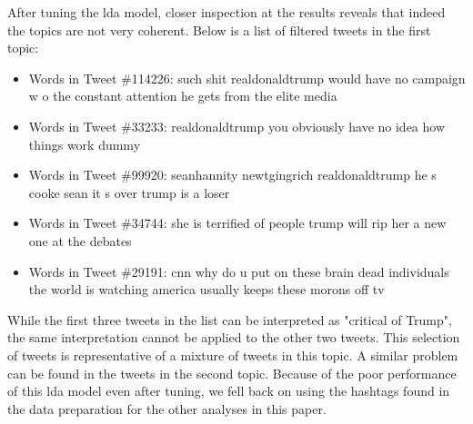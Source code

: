 \documentclass{article}
\begin{document}
  After tuning the lda model, closer inspection at the results reveals
  that indeed the topics are not very coherent. Below is a list of
  filtered tweets in the first topic:

  \begin{itemize}
    \item Words in Tweet \#114226: such shit realdonaldtrump would have
      no campaign w o the constant attention he gets from the elite
      media
    \item Words in Tweet \#33233:  realdonaldtrump you obviously have
      no idea how things work dummy
    \item Words in Tweet \#99920:  seanhannity newtgingrich
      realdonaldtrump he s cooke sean it s over trump is a loser
    \item Words in Tweet \#34744: she is terrified of people trump will
      rip her a new one at the debates
    \item Words in Tweet \#29191:  cnn why do u put on these brain dead individuals the world is watching america usually keeps these morons off tv 
  \end{itemize}

  While the first three tweets in the list can be interpreted as
  "critical of Trump", the same interpretation cannot be applied to
  the other two tweets. This selection of tweets is representative of
  a mixture of tweets in this topic. A similar problem can be found in
  the tweets in the second topic. Because of the poor performance of
  this lda model even after tuning, we fell back on using the hashtags
  found in the data preparation for the other analyses in this paper.    

\end{document}
